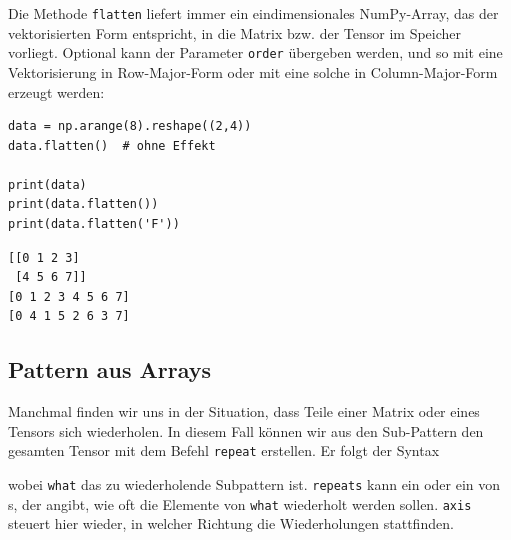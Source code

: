 Die Methode \texttt{flatten} liefert immer ein eindimensionales NumPy-Array, das der vektorisierten Form entspricht, in die Matrix bzw. der Tensor im Speicher vorliegt. Optional kann der Parameter \texttt{order} übergeben werden, und so mit  eine Vektorisierung in Row-Major-Form oder mit  eine solche in Column-Major-Form erzeugt werden:

\begin{tcbraster}[raster columns=2,
                  raster equal height,
                  nobeforeafter,
                  raster column skip=0.5cm]
\begin{codebox}
\begin{verbatim}
data = np.arange(8).reshape((2,4))
data.flatten()  # ohne Effekt

print(data)
print(data.flatten())
print(data.flatten('F'))
\end{verbatim}
\end{codebox}
%
\begin{cmdbox}
\begin{verbatim}
[[0 1 2 3]
 [4 5 6 7]]
[0 1 2 3 4 5 6 7]
[0 4 1 5 2 6 3 7]
\end{verbatim}
\end{cmdbox}
\end{tcbraster}

\subsection{Pattern aus Arrays}
Manchmal finden wir uns in der Situation, dass Teile einer Matrix oder eines Tensors sich wiederholen. In diesem Fall können wir aus den Sub-Pattern den gesamten Tensor mit dem Befehl \texttt{repeat} erstellen. Er folgt der Syntax
\begin{center}
\end{center}
wobei \texttt{what} das zu wiederholende Subpattern ist. \texttt{repeats} kann ein  oder ein  von s, der angibt, wie oft die Elemente von \texttt{what} wiederholt werden sollen. \texttt{axis} steuert hier wieder, in welcher Richtung die Wiederholungen stattfinden.

